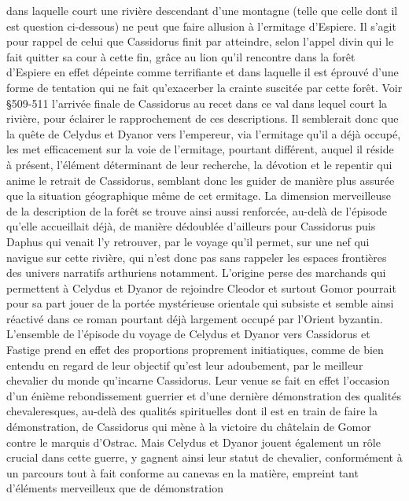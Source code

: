 \documentclass{article}
\begin{document}
\begin{pages}
         dans laquelle court une rivière descendant d'une montagne (telle que celle dont il est question ci-dessous)
         ne peut que faire allusion à l'ermitage d'Espiere. Il s'agit pour rappel de celui que Cassidorus finit par atteindre, 
         selon l'appel divin qui le fait quitter sa cour à cette fin, grâce au lion qu'il rencontre dans la forêt d'Espiere en effet dépeinte 
         comme terrifiante et dans laquelle il est éprouvé d'une forme de tentation qui ne fait qu'exacerber la crainte suscitée par cette forêt.
         Voir §509-511 l'arrivée finale de Cassidorus au recet dans ce val dans lequel court la rivière, pour éclairer le rapprochement 
         de ces descriptions. Il semblerait donc que la quête de Celydus et Dyanor vers l'empereur, 
         via l'ermitage qu'il a déjà occupé, les met efficacement sur la voie de l'ermitage, pourtant différent, auquel il réside à présent, 
         l'élément déterminant de leur recherche, la dévotion et le repentir qui anime le retrait de Cassidorus, semblant donc les guider 
         de manière plus assurée que la situation géographique même de cet ermitage. La dimension merveilleuse de la description de la forêt
         se trouve ainsi aussi renforcée, au-delà de l'épisode qu'elle accueillait déjà, de manière dédoublée d'ailleurs pour Cassidorus puis Daphus
         qui venait l'y retrouver, par le voyage qu'il permet, sur une nef qui navigue sur cette rivière, qui n'est donc pas sans rappeler 
         les espaces frontières des univers narratifs arthuriens notamment. L'origine perse des marchands qui permettent à Celydus et Dyanor
         de rejoindre Cleodor et surtout Gomor pourrait pour sa part jouer de la portée mystérieuse orientale qui subsiste et semble ainsi 
         réactivé dans ce roman pourtant déjà largement occupé par l'Orient byzantin. L'ensemble de l'épisode du voyage de Celydus et Dyanor
         vers Cassidorus et Fastige prend en effet des proportions proprement initiatiques, comme de bien entendu en regard de leur 
         objectif qu'est leur adoubement, par le meilleur chevalier du monde qu'incarne Cassidorus. Leur venue se fait en effet 
         l'occasion d'un énième rebondissement guerrier et d'une dernière démonstration des qualités chevaleresques, au-delà des qualités 
         spirituelles dont il est en train de faire la démonstration, de Cassidorus qui mène à la victoire du châtelain de Gomor contre le 
         marquis d'Ostrac. Mais Celydus et Dyanor jouent également un rôle crucial dans cette guerre, y gagnent ainsi leur statut de chevalier,
         conformément à un parcours tout à fait conforme au canevas en la matière, empreint tant d'éléments merveilleux que de démonstration

\end{pages}
\end{document}
